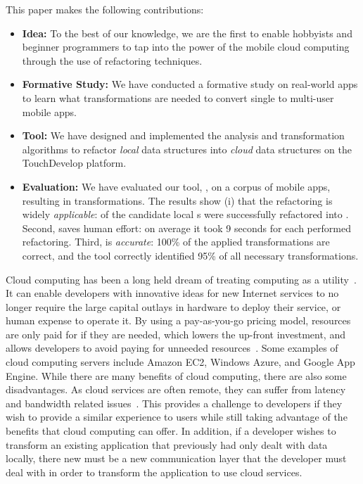 \documentclass{sigplanconf}
\begin{document}
This paper makes the following contributions:
\begin{itemize}
\item{\textbf{Idea:}} To the best of our knowledge, we are the first to enable hobbyists and beginner programmers to tap into the power of the mobile cloud
computing through the use of refactoring techniques.

\item{\textbf{Formative Study:}} We have conducted a formative study on \numFormative real-world apps to learn what transformations are needed to convert single to multi-user mobile apps. 

\item{\textbf{Tool:}} We have designed and implemented the analysis and transformation algorithms to refactor \emph{local} data structures into \emph{cloud} data structures on the TouchDevelop platform. 

\item{\textbf{Evaluation:}} We have evaluated our tool, \tool, on a corpus of \numScripts mobile apps, resulting in \numTransformations transformations. The results show (i) that the refactoring is widely \emph{applicable}: \percentRefactored of the candidate local s were successfully refactored into . Second, \tool saves human effort: on average it took 9 seconds for each performed refactoring. Third, \tool is  
\emph{accurate}: 100\% of the applied transformations are correct, and the tool correctly identified 95\% of all necessary transformations.  
\end{itemize}


Cloud computing has been a long held dream of treating computing as a utility~\cite{Armbrust:2010:VCC:1721654.1721672}.  It can enable developers with innovative ideas for new Internet services to no longer require the large capital outlays in hardware to deploy their service, or human expense to operate it.  By using a pay-as-you-go pricing model, resources are only paid for if they are needed, which lowers the up-front investment, and allows developers to avoid paying for unneeded resources~\cite{zhang2010cloud}.  Some examples of cloud computing servers include Amazon EC2, Windows Azure, and Google App Engine.  While there are many benefits of cloud computing, there are also some disadvantages. As cloud services are often remote, they can suffer from latency and bandwidth related issues~\cite{4804045}.  This provides a challenge to developers if they wish to provide a similar experience to users while still taking advantage of the benefits that cloud computing can offer.  In addition, if a developer wishes to transform an existing application that previously had only dealt with data locally, there new must be a new communication layer that the developer must deal with 
in order to transform the application to use cloud services.  
\end{document}
